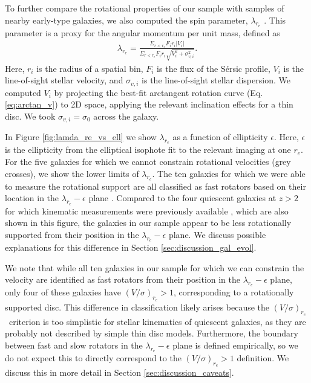 \documentclass{aa}
\newcommand{\vsigma}{$(V/\sigma)_{r_e}$}
\begin{document}
To further compare the rotational properties of our sample with samples of nearby early-type galaxies, we also computed the spin parameter, $\lambda_{r_e}$ \citep{EEmsellem2007,EEmsellem2011}. This parameter is a proxy for the angular momentum per unit mass, defined as 
\begin{align}\label{eq:spin_param}
    \lambda_{r_e} = \frac{\Sigma_{r < r_e}F_i r_i |V_i|}{\Sigma_{r<r_e}F_i r_i \sqrt{V_i^2 + \sigma_{v,i}^2}}.
\end{align}
Here, $r_i$ is the radius of a spatial bin, $F_i$ is the flux of the S\'ersic profile, $V_i$ is the line-of-sight stellar velocity, and $\sigma_{v,i}$ is the line-of-sight stellar dispersion. We computed $V_i$ by projecting the best-fit arctangent rotation curve (Eq. \eqref{eq:arctan_v}) to 2D space, applying the relevant inclination effects for a thin disc. We took $\sigma_{v,i} = \sigma_0$ across the galaxy.

In Figure \ref{fig:lamda_re_vs_ell} we show $\lambda_{r_e}$ as a function of ellipticity $\epsilon$. Here, $\epsilon$ is the ellipticity from the elliptical isophote fit to the relevant imaging at one $r_e$. For the five galaxies for which we cannot constrain rotational velocities (grey crosses), we show the lower limits of $\lambda_{r_e}$. The ten galaxies for which we were able to measure the rotational support are all classified as fast rotators based on their location in the $\lambda_{r_e}-\epsilon$ plane \citep{MCappellari2016}. Compared to the four quiescent galaxies at $z>2$ for which kinematic measurements were previously available \citep{ANewman2018b, FdEugenio2024}, which are also shown in this figure, the galaxies in our sample appear to be less rotationally supported from their position in the $\lambda_{r_e}-\epsilon$ plane. We discuss possible explanations for this difference in Section \ref{sec:discussion_gal_evol}.

We note that while all ten galaxies in our sample for which we can constrain the velocity are identified as fast rotators from their position in the $\lambda_{r_e}-\epsilon$ plane, only four of these galaxies have $(V/\sigma)_{r_e} > 1$, corresponding to a rotationally supported disc. This difference in classification likely arises because the \vsigma\ criterion is too simplistic for stellar kinematics of quiescent galaxies, as they are probably not described by simple thin disc models. Furthermore, the boundary between fast and slow rotators in the $\lambda_{r_e}-\epsilon$ plane is defined empirically, so we do not expect this to directly correspond to the $(V/\sigma)_{r_e} > 1$ definition. We discuss this in more detail in Section \ref{sec:discussion_caveats}.
\end{document}
